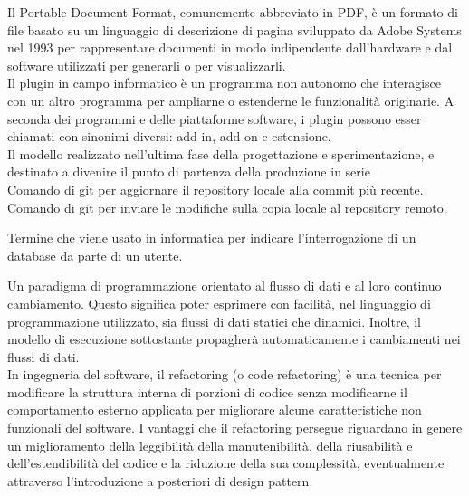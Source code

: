 \documentclass{scalatekids-article}
\begin{document}
   Il Portable Document Format, comunemente abbreviato in PDF, è un formato di file basato su un linguaggio di descrizione di pagina sviluppato da Adobe Systems nel 1993 per rappresentare documenti in modo indipendente dall'hardware e dal software utilizzati per generarli o per visualizzarli.
  \\

   Il plugin in campo informatico è un programma non autonomo che interagisce con un altro programma per ampliarne o estenderne le funzionalità originarie.
  A seconda dei programmi e delle piattaforme software, i plugin possono esser chiamati con sinonimi diversi: add-in, add-on e estensione.
  \\

   Il modello realizzato nell’ultima fase della progettazione e sperimentazione, e destinato a divenire il punto di partenza della produzione in serie
  \\

   Comando di git per aggiornare il repository locale alla commit più recente.
  \\

   Comando di git per inviare le modifiche sulla copia locale al repository remoto.
  \\


   Termine che viene usato in informatica per indicare l'interrogazione di un database da parte di un utente.
  \\

  
   Un paradigma di programmazione orientato al flusso di dati e al loro continuo cambiamento. 
  Questo significa poter esprimere con facilità, nel linguaggio di programmazione utilizzato, sia flussi di dati statici che dinamici.
  Inoltre, il modello di esecuzione sottostante propagherà automaticamente i cambiamenti nei flussi di dati. 
  \\

   In ingegneria del software, il refactoring (o code refactoring) è una tecnica per modificare la struttura interna di porzioni di codice senza modificarne il comportamento esterno applicata per migliorare alcune caratteristiche non funzionali del software.
  I vantaggi che il refactoring persegue riguardano in genere un miglioramento della leggibilità della manutenibilità, della riusabilità e dell'estendibilità del codice e la riduzione della sua complessità, eventualmente attraverso l'introduzione a posteriori di design pattern.
  \\
\end{document}
